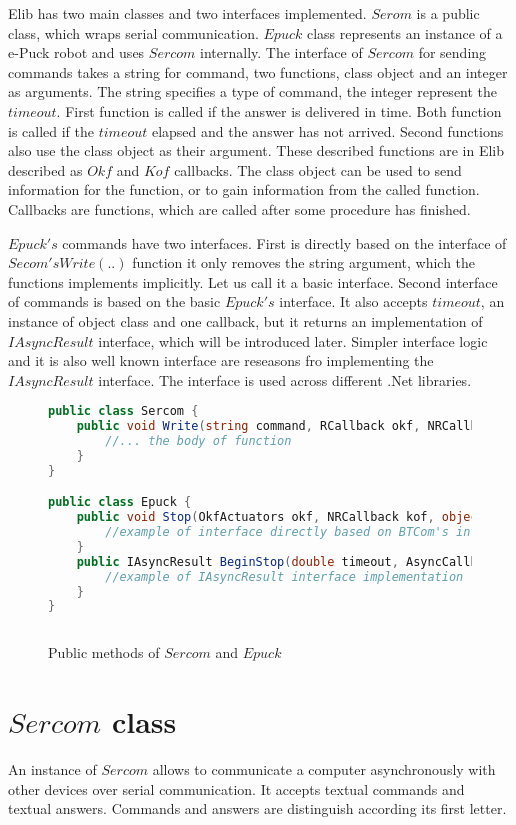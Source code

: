	Elib has two main classes and two interfaces implemented.
	$Serom$ is a public class, which wraps serial communication.
	$Epuck$ class represents an instance of a e-Puck robot and uses $Sercom$ internally.
	The interface of $Sercom$ for sending commands takes a
	string for command, two functions, class object and an integer as arguments.
	The string specifies a type of command, the integer represent the $timeout$.
	First function is called if the answer is delivered in time.
	Both function is called if the $timeout$ elapsed and the answer has not arrived.
	Second functions also use the class object as their argument.  These described
	functions are in Elib described as $Okf$ and $Kof$ callbacks. The class object
	can be used to send information for the function, or to gain information from the called function.
	Callbacks are functions, which are called after some procedure has finished.

	$Epuck's$ commands have two interfaces. First is directly based on the interface of 
	$Secom's Write(..)$ function it only removes the string argument, which the functions
	implements implicitly.
	Let us call it a basic interface.
	Second interface of commands is based on the basic $Epuck's$ interface. 
	It also accepts $timeout$, an instance of object class and one callback, but it returns 
	an implementation of $IAsyncResult$ interface, which will be introduced later.
	Simpler interface logic	and it is also well known interface  are reseasons fro implementing the $IAsyncResult$ interface.
	The interface is used across different .Net libraries.

	\begin{figure}[!hbp]
\begin{lstlisting}[language=cs]
public class Sercom {
	public void Write(string command, RCallback okf, NRCallback kof,object state, double timeout) {
		//... the body of function
	}
}

public class Epuck {
	public void Stop(OkfActuators okf, NRCallback kof, object state, double timeout) {
		//example of interface directly based on BTCom's interface
	}
	public IAsyncResult BeginStop(double timeout, AsyncCallback callback, Object state) {
		//example of IAsyncResult interface implementation
	}
}
 
\end{lstlisting}
	\caption{Public methods of $Sercom$ and $Epuck$} \label{serep}
	\end{figure}
\section{$Sercom$ class}\label{sec:sercom}
	An instance of $Sercom$ allows to communicate a computer asynchronously with other devices
	over serial communication. It accepts textual commands and textual answers.
	Commands and answers are distinguish according its first letter.
	
